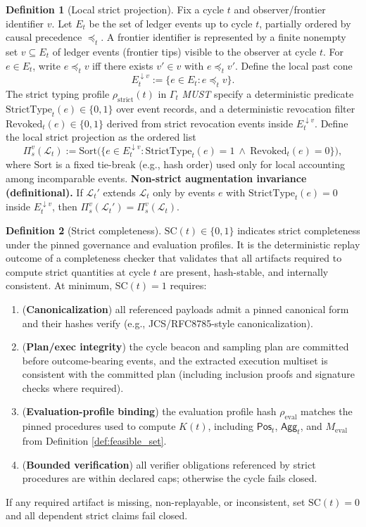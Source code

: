\documentclass[11pt,a4paper]{article}
\newcommand{\cL}{\mathcal{L}}
\theoremstyle{definition}
\newtheorem{definition}{Definition}
\theoremstyle{remark}
\begin{document}
\begin{definition}[Local strict projection]\label{def:local_strict_projection}
Fix a cycle $t$ and observer/frontier identifier $v$.
Let $E_t$ be the set of ledger events up to cycle $t$, partially ordered by causal precedence $\preceq_t$.
A frontier identifier is represented by a finite nonempty set $v\subseteq E_t$ of ledger events (frontier tips) visible to the observer at cycle $t$.
For $e\in E_t$, write $e\preceq_t v$ iff there exists $v'\in v$ with $e\preceq_t v'$.
Define the local past cone
\[
E_t^{\downarrow v}:=\{e\in E_t:e\preceq_t v\}.
\]
The strict typing profile $\rho_{\mathrm{strict}}(t)$ in $\Gamma_t$ \emph{MUST} specify a deterministic predicate $\mathrm{StrictType}_t(e)\in\{0,1\}$ over event records, and a deterministic revocation filter $\mathrm{Revoked}_t(e)\in\{0,1\}$ derived from strict revocation events inside $E_t^{\downarrow v}$.
Define the local strict projection as the ordered list
\[
\Pi_s^{v}(\cL_t)
:=\mathrm{Sort}\Big(\{e\in E_t^{\downarrow v}:\mathrm{StrictType}_t(e)=1\ \wedge\ \mathrm{Revoked}_t(e)=0\}\Big),
\]
where $\mathrm{Sort}$ is a fixed tie-break (e.g., hash order) used only for local accounting among incomparable events.
\noindent\textbf{Non-strict augmentation invariance (definitional).}
If $\cL_t'$ extends $\cL_t$ only by events $e$ with $\mathrm{StrictType}_t(e)=0$ inside $E_t^{\downarrow v}$, then $\Pi_s^{v}(\cL_t')=\Pi_s^{v}(\cL_t)$.
\end{definition}

\begin{definition}[Strict completeness]\label{def:strict_completeness}
$\mathrm{SC}(t)\in\{0,1\}$ indicates strict completeness under the pinned governance and evaluation profiles.
It is the deterministic replay outcome of a completeness checker that validates that all artifacts required to compute strict quantities at cycle $t$ are present, hash-stable, and internally consistent.
At minimum, $\mathrm{SC}(t)=1$ requires:
\begin{enumerate}
\item (\textbf{Canonicalization}) all referenced payloads admit a pinned canonical form and their hashes verify (e.g., JCS/RFC8785-style canonicalization).
\item (\textbf{Plan/exec integrity}) the cycle beacon and sampling plan are committed before outcome-bearing events, and the extracted execution multiset is consistent with the committed plan (including inclusion proofs and signature checks where required).
\item (\textbf{Evaluation-profile binding}) the evaluation profile hash $\rho_{\mathrm{eval}}$ matches the pinned procedures used to compute $K(t)$, including $\mathsf{Pos}_t$, $\mathsf{Agg}_t$, and $M_{\mathrm{eval}}$ from Definition \ref{def:feasible_set}.
\item (\textbf{Bounded verification}) all verifier obligations referenced by strict procedures are within declared caps; otherwise the cycle fails closed.
\end{enumerate}
If any required artifact is missing, non-replayable, or inconsistent, set $\mathrm{SC}(t)=0$ and all dependent strict claims fail closed.
\end{definition}
\end{document}
